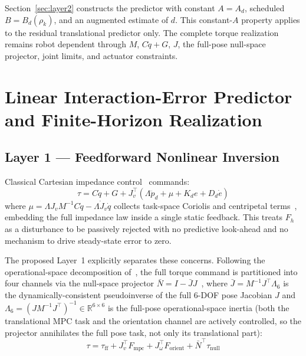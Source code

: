 \documentclass[journal]{IEEEtran}
\newcommand{\Fmpc}{F_{\text{mpc}}}
\newcommand{\Nbar}{\bar{N}}
\begin{document}
Section~\ref{sec:layer2} constructs the predictor with constant
$A=A_d$, scheduled $B=B_d(\rho_k)$, and an augmented estimate of $d$. This
constant-$A$ property applies to the residual translational predictor only.
The complete torque realization remains robot dependent through
$M$, $C\dot q+G$, $J$, the full-pose null-space projector, joint limits, and
actuator constraints.

\section{Linear Interaction-Error Predictor and Finite-Horizon Realization}

\subsection{Layer 1 --- Feedforward Nonlinear Inversion}
\label{sec:layer1}

Classical Cartesian impedance control~\cite{hogan1985impedance} commands:
\begin{equation*}
  \tau = C\dot{q}+G+J_v^\top(\Lambda\ddot{p}_d+\mu+K_de+D_d\dot{e})
\end{equation*}
where $\mu=\Lambda J_vM^{-1}C\dot{q}-\Lambda\dot{J}_v\dot{q}$ collects
task-space Coriolis and centripetal terms~\cite{khatib1987unified},
embedding the full impedance law inside a single static feedback.
This treats $F_h$ as a disturbance to be passively rejected with no
predictive look-ahead and no mechanism to drive steady-state error to
zero.

The proposed Layer~1 explicitly separates these concerns.
Following the operational-space decomposition of~\cite{khatib1987unified},
the full torque command is partitioned into four channels via the
null-space projector $\Nbar=I-\bar{J}J$~\cite{sentis2005synthesis}, where
$\bar{J}=M^{-1}J^\top\Lambda_6$ is the dynamically-consistent pseudoinverse
of the full $6$-DOF pose Jacobian $J$ and
$\Lambda_6=(JM^{-1}J^\top)^{-1}\in\mathbb{R}^{6\times6}$ is the full-pose
operational-space inertia (both the translational MPC task and the
orientation channel are actively controlled, so the projector annihilates
the full pose task, not only its translational part):
\begin{equation}\label{eq:tau}
  \tau = \tau_{\text{ff}}+J_v^\top\Fmpc
        +J_\omega^\top F_{\text{orient}}+\Nbar^\top\tau_{\text{null}}
\end{equation}
\end{document}
